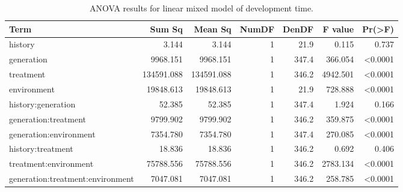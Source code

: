 \begin{table}[!h]
\centering
\caption{\label{tab:anova_devtime}ANOVA results for linear mixed model of development time.}
\centering
\begin{tabular}[t]{lrrrrrr}
\toprule
Term & Sum Sq & Mean Sq & NumDF & DenDF & F value & Pr(>F)\\
\midrule
history & 3.144 & 3.144 & 1 & 21.9 & 0.115 & 0.737\\
generation & 9968.151 & 9968.151 & 1 & 347.4 & 366.054 & <0.0001\\
treatment & 134591.088 & 134591.088 & 1 & 346.2 & 4942.501 & <0.0001\\
environment & 19848.613 & 19848.613 & 1 & 21.9 & 728.888 & <0.0001\\
history:generation & 52.385 & 52.385 & 1 & 347.4 & 1.924 & 0.166\\
\addlinespace
generation:treatment & 9799.902 & 9799.902 & 1 & 346.2 & 359.875 & <0.0001\\
generation:environment & 7354.780 & 7354.780 & 1 & 347.4 & 270.085 & <0.0001\\
history:treatment & 18.836 & 18.836 & 1 & 346.2 & 0.692 & 0.406\\
treatment:environment & 75788.556 & 75788.556 & 1 & 346.2 & 2783.134 & <0.0001\\
generation:treatment:environment & 7047.081 & 7047.081 & 1 & 346.2 & 258.785 & <0.0001\\
\bottomrule
\end{tabular}
\end{table}
